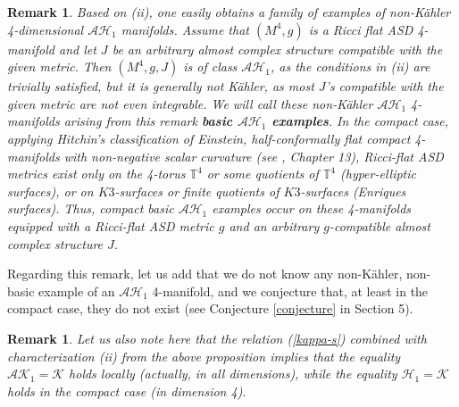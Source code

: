 \documentclass{amsart}
\newtheorem{remark}[theorem]{Remark}
\begin{document}
\begin{remark} \label{basic-exp}
Based on (ii), one easily obtains a family of examples of non-K\"ahler 4-dimensional $\mathcal{AH}_1$ manifolds. Assume that $(M^4, g)$ is a Ricci flat ASD 4-manifold and let $J$ be an arbitrary almost complex structure compatible with the given metric. Then $(M^4, g, J)$ is of class $\mathcal{AH}_1$, as the conditions in (ii) are trivially satisfied, but it is generally not K\"ahler, as most $J$'s compatible with the given metric are not even integrable. We will call these non-K\"ahler $\mathcal{AH}_1$ 4-manifolds arising from this remark {\bf basic $\mathcal{AH}_1$ examples}. In the compact case, applying Hitchin's classification of Einstein, half-conformally flat compact 4-manifolds with non-negative scalar curvature
(see \cite{besse}, Chapter 13), Ricci-flat ASD metrics exist only on the 4-torus $\mathbb{T}^4$ or some quotients of $\mathbb{T}^4$ (hyper-elliptic surfaces), or on $K3$-surfaces or finite quotients of $K3$-surfaces (Enriques surfaces). Thus, compact basic $\mathcal{AH}_1$ examples occur on these 4-manifolds equipped with a Ricci-flat ASD metric $g$ and an arbitrary $g$-compatible almost complex structure $J$.
\end{remark}

\noindent 
Regarding this remark, let us add that we do not know any non-K\"ahler, non-basic example of an $\mathcal{AH}_1$ 4-manifold, and we conjecture that, at least in the compact case, they do not exist (see Conjecture \ref{conjecture} in Section 5). 

\begin{remark} \label{AK1orH1=K}
    Let us also note here that the relation (\ref{kappa-s}) combined with characterization (ii) from the above proposition implies that the equality $\mathcal{AK}_1 = \mathcal{K} $ holds locally (actually, in all dimensions), while the equality $\mathcal{H}_1 = \mathcal{K}$ holds in the compact case (in dimension 4). 
\end{remark}
\end{document}

